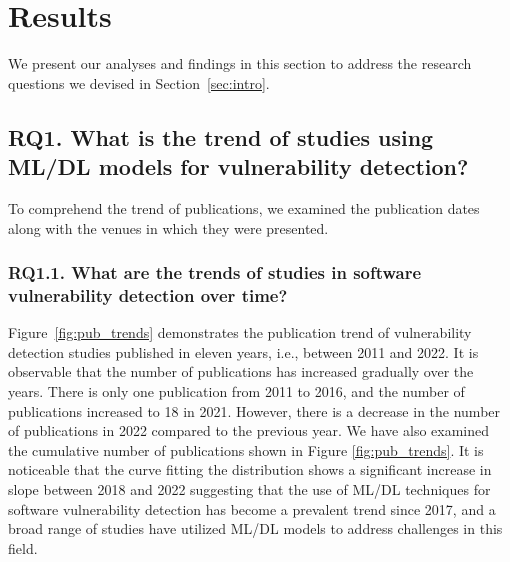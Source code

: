 \section{Results}


We present our analyses and findings in this section to address the research questions we devised in Section~\ref{sec:intro}. 

\subsection{RQ1. What is the trend of studies using ML/DL models for vulnerability detection?}

To comprehend the trend of publications, we examined the publication dates along with the venues in which they were presented.

\subsubsection{RQ1.1. What are the trends of studies in software vulnerability detection over time?}
Figure~\ref{fig:pub_trends} %
demonstrates the publication trend of vulnerability detection studies published in eleven years, i.e., between 2011 and 2022. It is observable that the number of publications has increased gradually over the years. There is only one publication from 2011 to 2016, and the number of publications increased to 18 in 2021. However, there is a decrease in the number of publications in 2022 compared to the previous year. We have also examined the cumulative number of publications shown in Figure \ref{fig:pub_trends}. It is noticeable that the curve fitting the distribution shows a significant increase in slope between 2018 and 2022 %
suggesting that the use of ML/DL techniques for software vulnerability detection has become a prevalent trend since 2017, and a broad range of studies have utilized ML/DL models to address challenges in this field.


